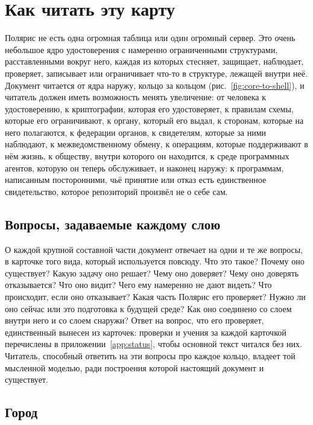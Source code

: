 \section{Как читать эту карту}
\label{sec:reading}

Полярис не есть одна огромная таблица или один огромный сервер. Это очень небольшое ядро
удостоверения с намеренно ограниченными структурами, расставленными вокруг него, каждая из
которых стесняет, защищает, наблюдает, проверяет, записывает или ограничивает что-то в структуре,
лежащей внутри неё. Документ читается от ядра наружу, кольцо за кольцом
(рис.~\ref{fig:core-to-shell}), и читатель должен иметь возможность менять увеличение: от
человека к удостоверению, к криптографии, которая его удостоверяет, к правилам схемы, которые его
ограничивают, к органу, который его выдал, к сторонам, которые на него полагаются, к федерации
органов, к свидетелям, которые за ними наблюдают, к межведомственному обмену, к операциям,
которые поддерживают в нём жизнь, к обществу, внутри которого он находится, к среде программных
агентов, которую он теперь обслуживает, и наконец наружу: к программам, написанным посторонними,
чьё принятие или отказ есть единственное свидетельство, которое репозиторий произвёл не о себе
сам.

\subsection{Вопросы, задаваемые каждому слою}

О каждой крупной составной части документ отвечает на одни и те же вопросы, в карточке того вида,
который используется повсюду. Что это такое? Почему оно существует? Какую задачу оно решает? Чему
оно доверяет? Чему оно доверять отказывается? Что оно видит? Чего ему намеренно не дают видеть?
Что происходит, если оно отказывает? Какая часть Полярис его проверяет? Нужно ли оно сейчас или
это подготовка к будущей среде? Как оно соединено со слоем внутри него и со слоем снаружи? Ответ на вопрос,
что его проверяет, единственный вынесен из карточек: проверки и учения за каждой карточкой
перечислены в приложении~\ref{app:status}, чтобы основной текст читался без них. Читатель,
способный ответить на эти вопросы про каждое кольцо, владеет той мысленной моделью, ради построения
которой настоящий документ и существует.

\subsection{Город}

